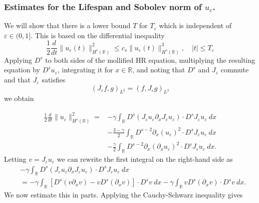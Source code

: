 \documentclass{beamer}
\newcommand{\rr}{\mathbb{R}}
\newcommand{\p}{\partial}
\newcommand{\ee}{\varepsilon}
\begin{document}
\begin{frame}
\frametitle{Estimates for the Lifespan and Sobolev norm of $u_\ee$.}
%
We will show that there is a lower bound  $T$
for $T_\ee$ which is independent of $\ee\in(0, 1]$.
This is based on the differential
inequality 
%
%
%
\begin{equation*} \label{B-diff-ineq}
\frac 12
\frac{d}{dt}
\|u_\ee(t)\|_{H^{s}(\rr)}^2
\le
c_s
\|u_\ee(t)\|_{H^{s}(\rr)}^3,
\quad
|t| \le T_\ee
\end{equation*}
%
%
%
%
%
%
%
Applying $D^s$ to both sides of the mollified HR equation,
multiplying the resulting equation by $D^s u_\ee$,
integrating it for $x\in\rr$, and noting that 
$D^s$ and $J_\ee$ commute
and that  $J_\ee$ satisfies 
%
%
\begin{equation*} 
\label{J-e-inner-prod-property}
(J_\ee f, g)_{L^2}=( f, J_\ee g)_{L^2}
\end{equation*}
%
%
we obtain

\end{frame}

\begin{frame}
%
%
%
\begin{equation*} \begin{split}
\label{B-moli-int}
 \frac 12
\frac{d}{dt} \|u_\ee \|_{H^s(\rr)}^2
=
& -
\gamma \int_{\rr}  D^s(J_\ee u_\ee \partial_x J_\ee u_\ee) \cdot
D^s J_\ee u_\ee  \  dx
\\
&- \frac{3 -\gamma}{2} \int_{\rr} D^{s-2} \p_x (u_{\ee})^2 \cdot D^s J_\ee 
u_{\ee} \ dx
\\
& - \frac{\gamma}{2} \int_{\rr}  D^{s-2} \p_x (\p_x u_\ee)^2
\cdot D^s J_\ee u_\ee  \ dx.
\end{split}
\end{equation*}
%
%
%
Letting $v=J_\ee u_\ee$ we can rewrite the first integral on the right-hand 
side as 
%
%
%
\begin{equation*} \begin{split}
\label{B-moli-int-v}
& -  \gamma \int_{\rr}   D^s (J_{\ee} u_{\ee} \p_x J_\ee u_\ee)
\cdot D^s
J_{\ee}u_\ee \ dx
\\
& = - \gamma \int_\rr
\left [ D^s(v\p_x v)  -  v D^s (\p_xv)
\right ] \cdot D^s v \ dx
- \gamma \int_\rr
v D^s (\p_xv) 
\cdot D^s v \ dx.
\end{split}
\end{equation*}
%
%
%
%
%
We now estimate this in parts. Applying the Cauchy-Schwarz 
inequality gives
%
%
%
\end{frame}
\end{document}
